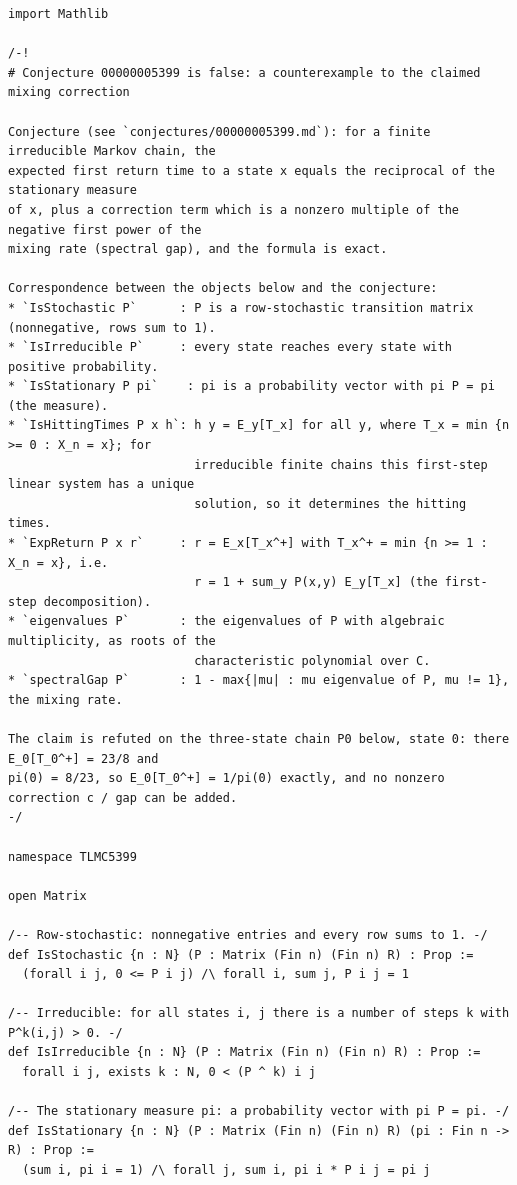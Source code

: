 \documentclass[11pt,a4paper]{article}
\begin{document}
\begin{lstlisting}[language={}]
import Mathlib

/-!
# Conjecture 00000005399 is false: a counterexample to the claimed mixing correction

Conjecture (see `conjectures/00000005399.md`): for a finite irreducible Markov chain, the
expected first return time to a state x equals the reciprocal of the stationary measure
of x, plus a correction term which is a nonzero multiple of the negative first power of the
mixing rate (spectral gap), and the formula is exact.

Correspondence between the objects below and the conjecture:
* `IsStochastic P`      : P is a row-stochastic transition matrix (nonnegative, rows sum to 1).
* `IsIrreducible P`     : every state reaches every state with positive probability.
* `IsStationary P pi`    : pi is a probability vector with pi P = pi (the measure).
* `IsHittingTimes P x h`: h y = E_y[T_x] for all y, where T_x = min {n >= 0 : X_n = x}; for
                          irreducible finite chains this first-step linear system has a unique
                          solution, so it determines the hitting times.
* `ExpReturn P x r`     : r = E_x[T_x^+] with T_x^+ = min {n >= 1 : X_n = x}, i.e.
                          r = 1 + sum_y P(x,y) E_y[T_x] (the first-step decomposition).
* `eigenvalues P`       : the eigenvalues of P with algebraic multiplicity, as roots of the
                          characteristic polynomial over C.
* `spectralGap P`       : 1 - max{|mu| : mu eigenvalue of P, mu != 1}, the mixing rate.

The claim is refuted on the three-state chain P0 below, state 0: there E_0[T_0^+] = 23/8 and
pi(0) = 8/23, so E_0[T_0^+] = 1/pi(0) exactly, and no nonzero correction c / gap can be added.
-/

namespace TLMC5399

open Matrix

/-- Row-stochastic: nonnegative entries and every row sums to 1. -/
def IsStochastic {n : N} (P : Matrix (Fin n) (Fin n) R) : Prop :=
  (forall i j, 0 <= P i j) /\ forall i, sum j, P i j = 1

/-- Irreducible: for all states i, j there is a number of steps k with P^k(i,j) > 0. -/
def IsIrreducible {n : N} (P : Matrix (Fin n) (Fin n) R) : Prop :=
  forall i j, exists k : N, 0 < (P ^ k) i j

/-- The stationary measure pi: a probability vector with pi P = pi. -/
def IsStationary {n : N} (P : Matrix (Fin n) (Fin n) R) (pi : Fin n -> R) : Prop :=
  (sum i, pi i = 1) /\ forall j, sum i, pi i * P i j = pi j


\end{lstlisting}
\end{document}
